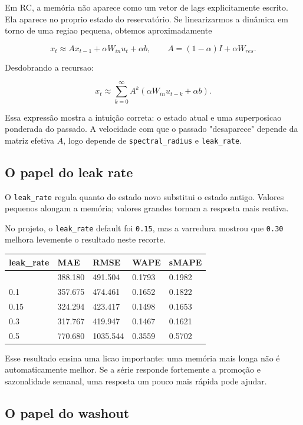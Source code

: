 \documentclass[12pt]{article}
\begin{document}
Em RC, a memória não aparece como um vetor de lags explicitamente escrito. Ela aparece no proprio estado do reservatório. Se linearizarmos a dinâmica em torno de uma regiao pequena, obtemos aproximadamente

\[
x_t \approx A x_{t-1} + \alpha W_{in} u_t + \alpha b,
\qquad
A = (1 - \alpha) I + \alpha W_{res}.
\]

Desdobrando a recursao:

\[
x_t \approx \sum_{k=0}^\infty A^k (\alpha W_{in} u_{t-k} + \alpha b).
\]

Essa expressão mostra a intuição correta: o estado atual e uma superposicao ponderada do passado. A velocidade com que o passado "desaparece" depende da matriz efetiva \(A\), logo depende de \texttt{spectral\_radius} e \texttt{leak\_rate}.

\subsection{O papel do leak rate}\label{21-o-papel-do-leak-rate}

O \texttt{leak\_rate} regula quanto do estado novo substitui o estado antigo. Valores pequenos alongam a memória; valores grandes tornam a resposta mais reativa.

No projeto, o \texttt{leak\_rate} default foi \texttt{0.15}, mas a varredura mostrou que \texttt{0.30} melhora levemente o resultado neste recorte.

\begin{longtable}[]{@{}lllll@{}}
\toprule\noalign{}
leak\_rate & MAE & RMSE & WAPE & sMAPE \\
\midrule\noalign{}
\endhead
\bottomrule\noalign{}
\endlastfoot
0.05 & 388.180 & 491.504 & 0.1793 & 0.1982 \\
0.1 & 357.675 & 474.461 & 0.1652 & 0.1822 \\
0.15 & 324.294 & 423.417 & 0.1498 & 0.1653 \\
0.3 & 317.767 & 419.947 & 0.1467 & 0.1621 \\
0.5 & 770.680 & 1035.544 & 0.3559 & 0.5702 \\
\end{longtable}

Esse resultado ensina uma licao importante: uma memória mais longa não é automaticamente melhor. Se a série responde fortemente a promoção e sazonalidade semanal, uma resposta um pouco mais rápida pode ajudar.

\subsection{O papel do washout}\label{22-o-papel-do-washout}
\end{document}
